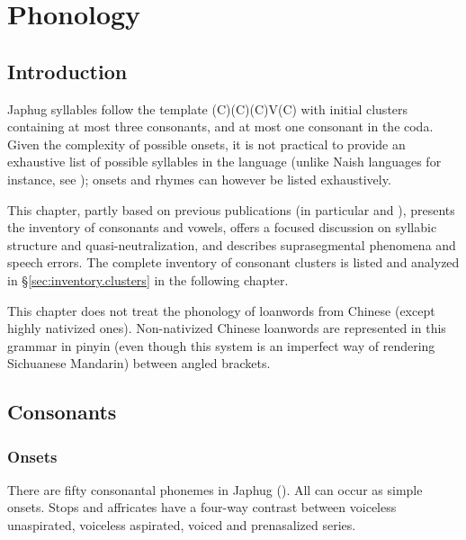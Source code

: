 \chapter{Phonology} \label{chap:phono}


\section{Introduction}
Japhug syllables follow the template (C)(C)(C)V(C) with initial clusters containing at most three consonants, and at most one consonant in the coda. Given the complexity of possible onsets, it is not practical to provide an exhaustive list of possible syllables in the language (unlike Naish languages for instance, see \citealt{boydalexis06}); onsets and rhymes can however be listed exhaustively.

This chapter, partly based on previous publications (in particular \citealt{jacques04these} and \citealt{jacques19ipa}), presents the inventory of consonants and vowels, offers a focused discussion on syllabic structure and quasi-neutralization, and describes suprasegmental phenomena and speech errors. The complete inventory of consonant clusters is listed and analyzed in §\ref{sec:inventory.clusters} in the following chapter.

This chapter does not treat the phonology of loanwords from Chinese (except highly nativized ones). Non-nativized Chinese loanwords are represented in this grammar in pinyin (even though this system is an imperfect way of rendering Sichuanese Mandarin) between angled brackets. 


\section{Consonants}

\subsection{Onsets} \label{sec:consonant.phonemes}
There are fifty consonantal phonemes in Japhug (). All can occur as simple onsets. Stops and affricates have a four-way contrast between voiceless unaspirated, voiceless aspirated, voiced and prenasalized series.


